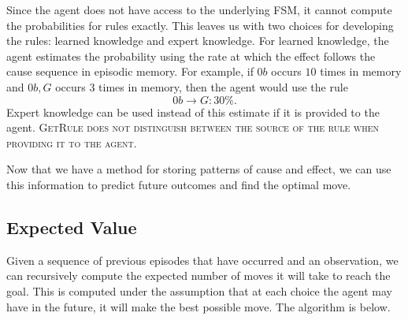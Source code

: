\documentclass[letterpaper]{article} %
\begin{document}
Since the agent does not have access to the underlying FSM, it cannot compute the probabilities for rules exactly. This leaves us with two choices for developing the rules: learned knowledge and expert knowledge. For learned knowledge, the agent estimates the probability using the rate at which the effect follows the cause sequence in episodic memory. For example, if $0b$ occurs $10$ times in memory and $0b,G$ occurs $3$ times in memory, then the agent would use the rule $$0b \rightarrow G: 30\%.$$ Expert knowledge can be used instead of this estimate if it is provided to the agent. \scshape GetRule \normalfont does not distinguish between the source of the rule when providing it to the agent.




Now that we have a method for storing patterns of cause and effect, we can use this information to predict future outcomes and find the optimal move.

\subsection{Expected Value}

Given a sequence of previous episodes that have occurred and an observation, we can recursively compute the expected number of moves it will take to reach the goal. This is computed under the assumption that at each choice the agent may have in the future, it will make the best possible move. The algorithm is below.
\end{document}
